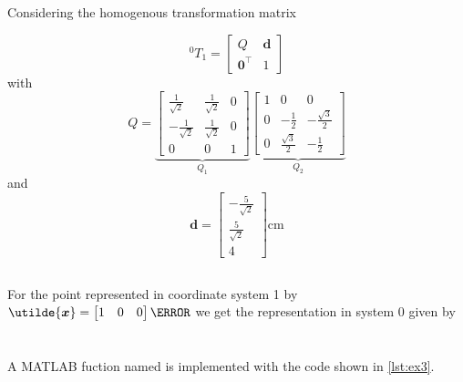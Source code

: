 \documentclass[a4paper]{article}
\begin{document}
\section{}
Considering the homogenous transformation matrix

\begin{equation}
    ^0T_1 = \begin{bmatrix}
        Q & \bm{d} \\ \bm{0}^\top & 1
    \end{bmatrix}
\end{equation}
with
\begin{equation}
    Q = \underbrace{\begin{bmatrix}
        \frac{1}{\sqrt{2}} & \frac{1}{\sqrt{2}} & 0 \\
        -\frac{1}{\sqrt{2}} & \frac{1}{\sqrt{2}} & 0 \\
        0 & 0 & 1
    \end{bmatrix}}_{Q_1}
    \underbrace{\begin{bmatrix}
        1 & 0 & 0 \\
        0 & -\frac{1}{2} & -\frac{\sqrt{3}}{2} \\
        0 & \frac{\sqrt{3}}{2} & -\frac{1}{2}
    \end{bmatrix}}_{Q_2}
\end{equation}
and 
\begin{equation}
    \bm{d} = \begin{bmatrix}
        -\frac{5}{\sqrt{2}} \\ \frac{5}{\sqrt{2}} \\ 4
    \end{bmatrix} \si{\cm}
\end{equation}

\subsection{}

\subsection{}
For the point represented in coordinate system 1 by $\utilde{\bm{x}} = \begin{bmatrix} 1&0&0 \end{bmatrix}\cm $ we get the representation in system 0 given by

\section{}
A MATLAB fuction named  is implemented with the code shown in \autoref{lst:ex3}.

\end{document}
